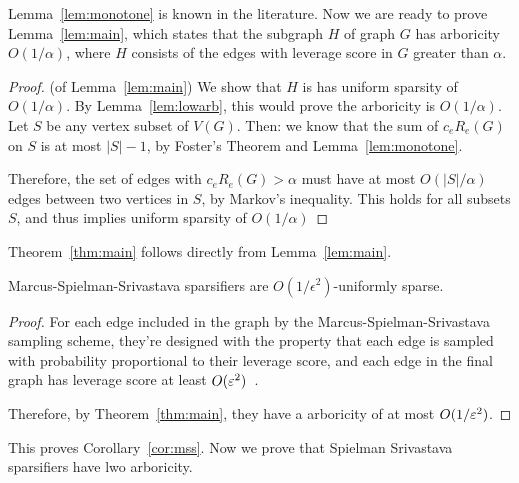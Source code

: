 Lemma~\ref{lem:monotone} is known in the literature.
% 
% 
% 
Now we are ready to prove Lemma~\ref{lem:main}, which states that the subgraph
$H$ of graph $G$ has arboricity $O(1/\alpha)$, where $H$ consists of the edges with leverage score in
$G$ greater than $\alpha$.
\begin{proof} (of Lemma~\ref{lem:main})
  We show that $H$ is has uniform sparsity of $O(1/\alpha)$.  By Lemma~\ref{lem:lowarb}, this would prove the
  arboricity is $O(1/ \alpha)$.
  Let $S$ be any vertex subset of $V(G)$. Then: we know that the sum of
  $c_e R_e(G)$ on $S$ is at most $|S|-1$, by Foster's Theorem and
  Lemma~\ref{lem:monotone}.

  Therefore,  the set of edges with $c_e R_e(G) > \alpha$ must have at
  most $O(|S|/\alpha)$ edges between two vertices in $S$, by
  Markov's inequality.  This holds for all subsets $S$, and thus implies
  uniform sparsity of $O(1/\alpha)$
\end{proof}
Theorem~\ref{thm:main} follows directly from Lemma~\ref{lem:main}.

\begin{theorem}
Marcus-Spielman-Srivastava sparsifiers are $O(1/\epsilon^2)$-uniformly sparse.
\end{theorem}

\begin{proof} 
For each edge included in the graph by the Marcus-Spielman-Srivastava
sampling scheme, they're designed with the property that each edge is
sampled with probability proportional to their leverage score, and each
edge in the final graph has leverage score at least
$O(\varepsilon^2)$~\cite{Srivastava13, MarcusSS13}.

Therefore, by Theorem~\ref{thm:main}, they have a arboricity of at most $O(1/\varepsilon^2)$.
\end{proof}
This proves Corollary~\ref{cor:mss}. Now we prove that Spielman
Srivastava sparsifiers have lwo arboricity.

